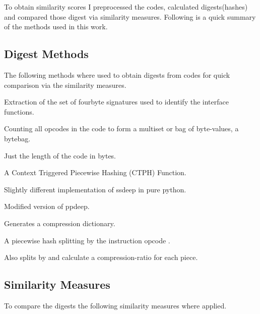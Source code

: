 \documentclass[../main.tex]{subfiles}
\begin{document}
To obtain similarity scores I preprocessed the codes, calculated digests(hashes) and compared those digest via similarity measures. Following is a quick summary of the methods used in this work.

\subsection{Digest Methods}
The following methods where used to obtain digests from codes for quick comparison via the similarity measures.

\begin{description}[style=unboxed,leftmargin=0cm]%
  \item[Fourbytes]
    Extraction of the set of fourbyte signatures used to identify the interface functions. \cite{ethutils}

  \item[Bytebag]
    Counting all opcodes in the code to form a multiset or bag of byte-values, a bytebag. \cite{ethereum-contract-similarity}

  \item[Size]
    Just the length of the code in bytes.

  \item[ssdeep]
    A Context Triggered Piecewise Hashing (CTPH) Function. \cite{kornblum2006identifying}

  \item[ppdeep]
    Slightly different implementation of ssdeep in pure python. \cite{ppdeep}

  \item[ppdeep\_mod]
    Modified version of ppdeep. \cite{ethereum-contract-similarity}

  \item[LZJD - Lempel-Ziv Jaccard Distance]
    Generates a compression dictionary. \cite{raff2018lempel}

  \item[jumpHash]
    A piecewise hash splitting by the  instruction opcode . \cite{ethereum-contract-similarity}

  \item[bzHash]
    Also splits by  and calculate a compression-ratio for each piece. \cite{ethereum-contract-similarity}
\end{description}

\subsection{Similarity Measures}
To compare the digests the following similarity measures where applied.
\end{document}
